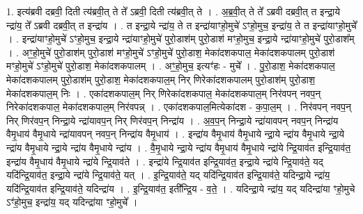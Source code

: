\documentclass[17pt]{extarticle}
\begin{document}
1. इत्य॑ब्रवी दब्रवी॒ दिती त्य॑ब्रवी॒त् ते ते᳚ ऽब्रवी॒ दिती त्य॑ब्रवी॒त् ते । . अ॒ब्र॒वी॒त् ते ते᳚ ऽब्रवी दब्रवी॒त् त इन्द्रा॒ये न्द्रा॑य॒ ते᳚ ऽब्रवी दब्रवी॒त् त इन्द्रा॑य । . त इन्द्रा॒ये न्द्रा॑य॒ ते त इन्द्रा॑याꣳहो॒मुचे॑ ऽꣳहो॒मुच॒ इन्द्रा॑य॒ ते त इन्द्रा॑याꣳहो॒मुचे᳚ । . इन्द्रा॑याꣳहो॒मुचे॑ ऽꣳहो॒मुच॒ इन्द्रा॒ये न्द्रा॑याꣳहो॒मुचे॑ पुरो॒डाश॑म् पुरो॒डाश॑ मꣳहो॒मुच॒ इन्द्रा॒ये न्द्रा॑याꣳहो॒मुचे॑ पुरो॒डाश᳚म् । . अꣳ॒॒हो॒मुचे॑ पुरो॒डाश॑म् पुरो॒डाश॑ मꣳहो॒मुचे॑ ऽꣳहो॒मुचे॑ पुरो॒डाश॒ मेका॑दशकपाल॒ मेका॑दशकपालम् पुरो॒डाश॑ मꣳहो॒मुचे॑ ऽꣳहो॒मुचे॑ पुरो॒डाश॒ मेका॑दशकपालम् । . अꣳ॒॒हो॒मुच॒ इत्यꣳ॑हः - मुचे᳚ । . पु॒रो॒डाश॒ मेका॑दशकपाल॒ मेका॑दशकपालम् पुरो॒डाश॑म् पुरो॒डाश॒ मेका॑दशकपाल॒म् निर् णिरेका॑दशकपालम् पुरो॒डाश॑म् पुरो॒डाश॒ मेका॑दशकपाल॒म् निः । . एका॑दशकपाल॒म् निर् णिरेका॑दशकपाल॒ मेका॑दशकपाल॒म् निर॑वपन् नवप॒न् निरेका॑दशकपाल॒ मेका॑दशकपाल॒म् निर॑वपन्न् । . एका॑दशकपाल॒मित्येका॑दश - क॒पा॒ल॒म् । . निर॑वपन् नवप॒न् निर् णिर॑वप॒न् निन्द्रा॒ये न्द्रा॑यावप॒न् निर् णिर॑वप॒न् निन्द्रा॑य । . अ॒व॒प॒न् निन्द्रा॒ये न्द्रा॑यावपन् नवप॒न् निन्द्रा॑य वैमृ॒धाय॑ वैमृ॒धाये न्द्रा॑यावपन् नवप॒न् निन्द्रा॑य वैमृ॒धाय॑ । . इन्द्रा॑य वैमृ॒धाय॑ वैमृ॒धाये न्द्रा॒ये न्द्रा॑य वैमृ॒धाये न्द्रा॒ये न्द्रा॑य वैमृ॒धाये न्द्रा॒ये न्द्रा॑य वैमृ॒धाये न्द्रा॑य । . वै॒मृ॒धाये न्द्रा॒ये न्द्रा॑य वैमृ॒धाय॑ वैमृ॒धाये न्द्रा॑ये न्द्रि॒याव॑त इन्द्रि॒याव॑त॒ इन्द्रा॑य वैमृ॒धाय॑ वैमृ॒धाये न्द्रा॑ये न्द्रि॒याव॑ते । . इन्द्रा॑ये न्द्रि॒याव॑त इन्द्रि॒याव॑त॒ इन्द्रा॒ये न्द्रा॑ये न्द्रि॒याव॑ते॒ यद् यदि॑न्द्रि॒याव॑त॒ इन्द्रा॒ये न्द्रा॑ये न्द्रि॒याव॑ते॒ यत् । . इ॒न्द्रि॒याव॑ते॒ यद् यदि॑न्द्रि॒याव॑त इन्द्रि॒याव॑ते॒ यदिन्द्रा॒ये न्द्रा॑य॒ यदि॑न्द्रि॒याव॑त इन्द्रि॒याव॑ते॒ यदिन्द्रा॑य । . इ॒न्द्रि॒याव॑त॒ इती᳚न्द्रि॒य - व॒ते॒ । . यदिन्द्रा॒ये न्द्रा॑य॒ यद् यदिन्द्रा॑या ꣳहो॒मुचे ऽꣳ॑हो॒मुच॒ इन्द्रा॑य॒ यद् यदिन्द्रा॑या ꣳहो॒मुचे᳚ । \newline
\end{document}
